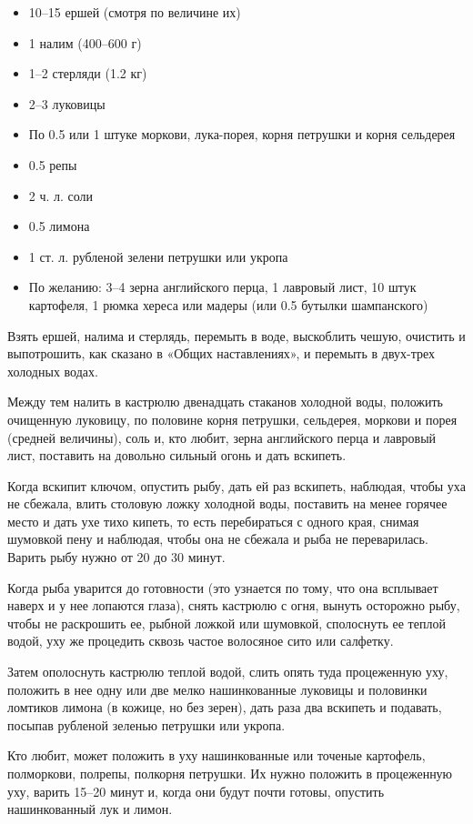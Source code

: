 \begin{itemize}
	\item 10–15 ершей (смотря по величине их) 
    \item 1 налим (400–600 г) 
    \item 1–2 стерляди (1.2 кг) 
    \item 2–3 луковицы 
    \item По 0.5 или 1 штуке моркови, лука-порея, корня петрушки и корня сельдерея 
    \item 0.5 репы 
    \item 2 ч. л. соли 
    \item 0.5 лимона 
    \item 1 ст. л. рубленой зелени петрушки или укропа
	\item По желанию: 3–4 зерна английского перца, 1 лавровый лист, 10 штук картофеля, 1 рюмка хереса или мадеры (или 0.5 бутылки шампанского)
\end{itemize}

Взять ершей, налима и стерлядь, перемыть в воде, выскоблить чешую, очистить и выпотрошить, как сказано в «Общих наставлениях», и перемыть в двух-трех холодных водах.

Между тем налить в кастрюлю двенадцать стаканов холодной воды, положить очищенную луковицу, по половине корня петрушки, сельдерея, моркови и порея (средней величины), соль и, кто любит, зерна английского перца и лавровый лист, поставить на довольно сильный огонь и дать вскипеть.

Когда вскипит ключом, опустить рыбу, дать ей раз вскипеть, наблюдая, чтобы уха не сбежала, влить столовую ложку холодной воды, поставить на менее горячее место и дать ухе тихо кипеть, то есть перебираться с одного края, снимая шумовкой пену и наблюдая, чтобы она не сбежала и рыба не переварилась. Варить рыбу нужно от 20 до 30 минут.

Когда рыба уварится до готовности (это узнается по тому, что она всплывает наверх и у нее лопаются глаза), снять кастрюлю с огня, вынуть осторожно рыбу, чтобы не раскрошить ее, рыбной ложкой или шумовкой, сполоснуть ее теплой водой, уху же процедить сквозь частое волосяное сито или салфетку.

Затем ополоснуть кастрюлю теплой водой, слить опять туда процеженную уху, положить в нее одну или две мелко нашинкованные луковицы и половинки ломтиков лимона (в кожице, но без зерен), дать раза два вскипеть и подавать, посыпав рубленой зеленью петрушки или укропа.

Кто любит, может положить в уху нашинкованные или точеные картофель, полморкови, полрепы, полкорня петрушки. Их нужно положить в процеженную уху, варить 15–20 минут и, когда они будут почти готовы, опустить нашинкованный лук и лимон.

